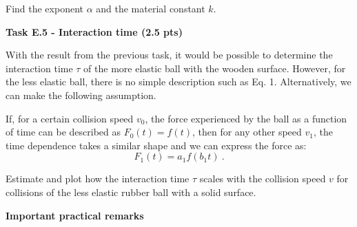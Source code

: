 Find the exponent $\alpha$ and the material constant $k$.

\textbf{Task E.5 - Interaction time (2.5 pts)}

With the result from the previous task, it would be possible to determine the
interaction time $\tau$ of the more elastic ball with the wooden surface.
However, for the less elastic ball, there is no simple description such as
Eq. 1. Alternatively, we can make the following assumption.

If, for a certain collision speed $v_0$, the force experienced by the ball as a
function of time can be described as $F_0(t) = f(t)$, then for any other speed
$v_1$, the time dependence takes a similar shape and we can express the force
as:
\begin{equation}
F_1(t) = a_1 f(b_1 t) \ . \tag{2}
\end{equation}

Estimate and plot how the interaction time $\tau$ scales with the collision
speed $v$ for collisions of the less elastic rubber ball with a solid surface.

\textbf{Important practical remarks}

